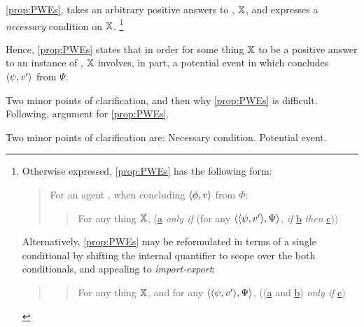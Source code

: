\begin{note}
  \autoref{prop:PWEs}, takes an arbitrary positive answers to \qzS{}, \(\qzSaV{}\), and expresses a \emph{necessary} condition on \(\qzSaV{}\).%
  \footnote{
    Otherwise expressed, \autoref{prop:PWEs} has the following form:

    \begin{quote}
      For an agent \vAgent{}, when concluding \(\pv{\phi}{v}\) from \(\Phi\):
      \begin{quote}
        For any thing \(\qzSaV{}\), (\hyperref[prop:PWEs:a]{a} \emph{only if} (for any \(\pvp{\psi}{v'}{\Psi}\), \emph{if} \hyperref[prop:PWEs:b]{b} \emph{then} \hyperref[prop:PWEs:c]{c}))
      \end{quote}
    \end{quote}
    Alternatively, \autoref{prop:PWEs} may be reformulated in terms of a single conditional by shifting the internal quantifier to scope over the both conditionals, and appealing to \emph{import-export}:
    \begin{quote}
      \begin{quote}
        For any thing \(\qzSaV{}\), and for any \(\pvp{\psi}{v'}{\Psi}\), ((\hyperref[prop:PWEs:a]{a} and \hyperref[prop:PWEs:b]{b}) \emph{only if} \hyperref[prop:PWEs:c]{c})
      \end{quote}
    \end{quote}
  }

  Hence, \autoref{prop:PWEs} states that in order for some thing \(\qzSaV{}\) to be a positive answer to an instance of \qzS{}, \(\qzSaV{}\) involves, in part, a potential event in which \vAgent{} concludes \(\pv{\psi}{v'}\) from \(\Psi\).
\end{note}

\begin{note}
  Two minor points of clarification, and then why \autoref{prop:PWEs} is difficult.
  Following, argument for \autoref{prop:PWEs}.

  Two minor points of clarification are:
  Necessary condition.
  Potential event.
\end{note}

